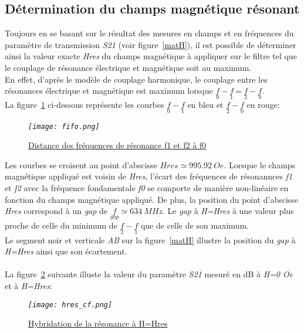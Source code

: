 \documentclass[12pt,fleqn]{book} %
\begin{document}
\subsection{Détermination du champs magnétique résonant}
\noindent Toujours en se basant sur le résultat des mesures en champs et en fréquences du paramètre de transmission \emph{S21} (voir figure~\underline{\color{blue}\ref{matH}}), il est possible de déterminer ainsi la valeur exacte \emph{Hres} du champs magnétique à appliquer sur le filtre tel que le couplage de résonance électrique et magnétique soit au maximum.
~\\En effet, d'après le modèle de couplage harmonique\footnotemark[3], le couplage entre les résonances électrique et magnétique est maximum lorsque $\underset{0}{f}-\underset{1}{f}\ \text{=}\ \underset{2}{f}-\underset{0}{f}$.
~\\La figure~\underline{\color{blue}\ref{fifo}} ci-dessous représente les courbes $\underset{0}{f}-\underset{1}{f}$ en bleu et $\underset{2}{f}-\underset{0}{f}$ en rouge:
\begin{figure}[H]
	\centering
	\itshape
	\texttt{[image: fifo.png]}
	\caption{\label{fifo} \underline{Distance des fréquences de résonance f1 et f2 à f0}}
\end{figure}
\noindent Les courbes se croisent au point d'abscisse $ Hres\simeq995.92\ Oe$. Lorsque le champs magnétique appliqué est voisin de \emph{Hres}, l'écart des fréquences de résonannces \emph{f1} et \emph{f2} avec la fréquence fondamentale \emph{f0} se comporte de manière non-linéaire en fonction du champs magnétique appliqué.
De plus, la position du point d'abscisse \emph{Hres} correspond à un \emph{gap} de $ \underset{gap}{f}\simeq634\ MHz$. Le \emph{gap} à \emph{H=Hres} à une valeur plus proche de celle du minimum de $\underset{2}{f}-\underset{1}{f}$ que de celle de son maximum. 
~\\Le segment noir et verticale \emph{AB} sur la figure~\underline{\color{blue}\ref{matH}} illustre la position du \emph{gap} à \emph{H=Hres} ainsi que son écartement.
~\\\\La figure~\underline{\color{blue}\ref{hres_cf}} suivante illuste la valeur du paramètre \emph{S21} mesuré en dB à \emph{H=0 Oe} et à \emph{H=Hres}:
\begin{figure}[H]
	\centering
	\itshape
	\texttt{[image: hres\_cf.png]}
	\caption{\label{hres_cf} \underline{Hybridation de la résonance à H=Hres}}
\end{figure}
\end{document}
